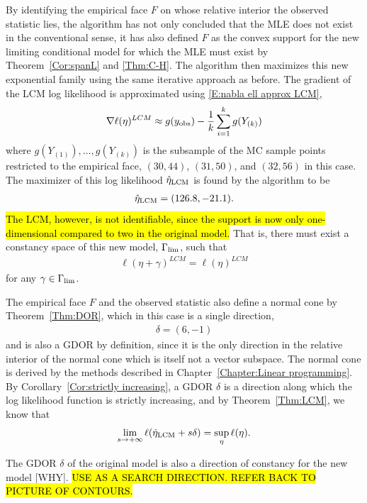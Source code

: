 By identifying the empirical face $F$ on whose relative interior the observed 
statistic lies, 
the algorithm has not only concluded that the MLE does not exist in the conventional 
sense, it has also defined $F$ as the convex support for the new limiting conditional 
model for which the MLE must exist by Theorem~\ref{Cor:spanL} and \ref{Thm:C-H}.
The algorithm then maximizes this new exponential family using the same 
iterative approach as before.  The gradient of the LCM log likelihood is approximated 
using \eqref{E:nabla ell approx LCM},
\begin{align*}
	\nabla \ell( \eta )^{LCM} \approx g(y_{\text{obs}}) - \frac{1}{k} \sum_{i=1}^k g(Y_{(k)})
\end{align*}
where $g(Y_{(1)}), \ldots, g(Y_{(k)})$ is the subsample of the MC sample points 
restricted to the empirical face, $(30,44)$, $(31,50)$, and $(32,56)$ in this case.  
The maximizer of this log likelihood $\hat{\eta}_{\textrm{LCM}}$ is found by the algorithm to
be
\begin{align*}
\hat{\eta}_{\textrm{LCM}} = (126.8, -21.1).
\end{align*}
\hl{The LCM, however, is not identifiable, since the support is now only one-dimensional 
compared to two in the original model. } 
That is, there must exist a constancy space of this new model, $\Gamma_{\textrm{lim}}$, such that 
\begin{align} \label{E:Gammalim}
\ell( \eta + \gamma )^{LCM} = \ell( \eta )^{LCM}
\end{align}
for any $\gamma \in \Gamma_{\textrm{lim}}$.

The empirical face $F$ and the observed statistic also define a normal cone by Theorem~\ref{Thm:DOR}, which in this case is a single direction, 
\begin{align*}
	\delta = (6,-1)
\end{align*}
and is also a GDOR by definition, since it is the only direction in the 
relative interior of the normal cone which is itself not a vector subspace.  
The normal 
cone is derived by the methods described in Chapter~\ref{Chapter:Linear programming}.
By Corollary~\ref{Cor:strictly increasing}, a GDOR $\delta$ is a direction along which the log likelihood function is strictly increasing, and by 
Theorem~\ref{Thm:LCM}, we know that
\begin{align} \label{E:GDOR lim}
	\lim_{s \to +\infty} \ell( \hat{\eta}_{\textrm{LCM}} + s \delta) = \sup_{\eta} \ell(\eta).
\end{align}


The GDOR $\delta$ of the original model is also a direction of constancy for the new 
model [WHY].  \hl{USE AS A SEARCH DIRECTION.  REFER BACK TO PICTURE OF CONTOURS.}

